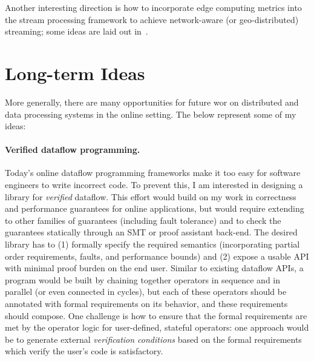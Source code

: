 
Another interesting direction is how to incorporate edge computing metrics into the stream processing framework to achieve network-aware (or geo-distributed) streaming; some ideas are laid out in~.

\section{Long-term Ideas}

More generally, there are many opportunities for future wor on distributed and data processing systems in the online setting.
The below represent some of my ideas:

\paragraph{Verified dataflow programming.}
Today's online dataflow programming frameworks
make it too easy for software engineers to write incorrect code.
To prevent this, I am interested in designing a library for \emph{verified} dataflow.
This effort would build on my work in correctness and performance guarantees for online applications, but would require extending to other families of guarantees (including fault tolerance) and to check the guarantees statically through an SMT or proof assistant back-end.
The desired library has to (1) formally specify the required semantics (incorporating partial order requirements, faults, and performance bounds) and (2) expose a usable API with minimal proof burden on the end user.
Similar to existing dataflow APIs, a program would be built by chaining together operators in sequence and in parallel (or even connected in cycles),
but each of these operators should be annotated with formal requirements on its behavior, and these requirements should compose.
One challenge is how to ensure that the formal requirements are met by the operator logic for user-defined, stateful operators: one approach would be to generate external \emph{verification conditions} based on the formal requirements which verify the user's code is satisfactory.

